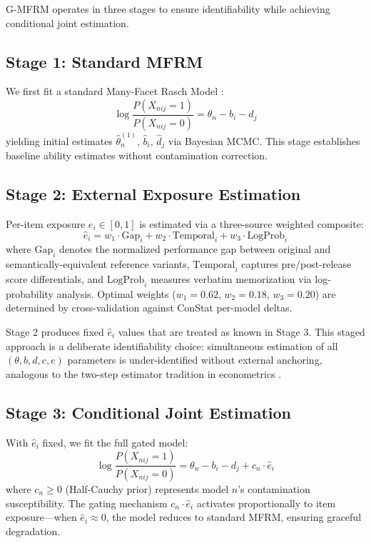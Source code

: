 \documentclass[letterpaper,11pt]{article}
\begin{document}
G-MFRM operates in three stages to ensure identifiability while achieving conditional joint estimation.

\subsection{Stage 1: Standard MFRM}

We first fit a standard Many-Facet Rasch Model \citep{linacre1989manyfacet,eckes2011introduction}:
\begin{equation}
\log\frac{P(X_{nij}=1)}{P(X_{nij}=0)} = \theta_n - b_i - d_j
\label{eq:mfrm}
\end{equation}
yielding initial estimates $\hat{\theta}^{(1)}_n$, $\hat{b}_i$, $\hat{d}_j$ via Bayesian MCMC. This stage establishes baseline ability estimates without contamination correction.

\subsection{Stage 2: External Exposure Estimation}

Per-item exposure $e_i \in [0,1]$ is estimated via a three-source weighted composite:
\begin{equation}
\hat{e}_i = w_1 \cdot \text{Gap}_i + w_2 \cdot \text{Temporal}_i + w_3 \cdot \text{LogProb}_i
\end{equation}
where $\text{Gap}_i$ denotes the normalized performance gap between original and semantically-equivalent reference variants, $\text{Temporal}_i$ captures pre/post-release score differentials, and $\text{LogProb}_i$ measures verbatim memorization via log-probability analysis. Optimal weights ($w_1 = 0.62$, $w_2 = 0.18$, $w_3 = 0.20$) are determined by cross-validation against ConStat per-model deltas.

Stage 2 produces fixed $\hat{e}_i$ values that are treated as known in Stage 3. This staged approach is a deliberate identifiability choice: simultaneous estimation of all $({\theta}, {b}, {d}, {c}, {e})$ parameters is under-identified without external anchoring, analogous to the two-step estimator tradition in econometrics \citep{heckman1979sample}.

\subsection{Stage 3: Conditional Joint Estimation}

With $\hat{e}_i$ fixed, we fit the full gated model:
\begin{equation}
\log\frac{P(X_{nij}=1)}{P(X_{nij}=0)} = \theta_n - b_i - d_j + c_n \cdot \hat{e}_i
\label{eq:gmfrm}
\end{equation}
where $c_n \geq 0$ (Half-Cauchy prior) represents model $n$'s contamination susceptibility. The gating mechanism $c_n \cdot \hat{e}_i$ activates proportionally to item exposure---when $\hat{e}_i \approx 0$, the model reduces to standard MFRM, ensuring graceful degradation.
\end{document}
